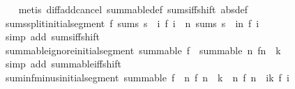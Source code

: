 \begin{isabellebody}
%
\isadelimproof
\ \ %
\endisadelimproof
%
\isatagproof
{}\isamarkupfalse%
\ {\isacharparenleft}{\kern0pt}metis\ diff{\isacharunderscore}{\kern0pt}add{\isacharunderscore}{\kern0pt}cancel\ summable{\isacharunderscore}{\kern0pt}def\ sums{\isacharunderscore}{\kern0pt}iff{\isacharunderscore}{\kern0pt}shift\ {\isacharbrackleft}{\kern0pt}abs{\isacharunderscore}{\kern0pt}def{\isacharbrackright}{\kern0pt}{\isacharparenright}{\kern0pt}%
\endisatagproof
{\isafoldproof}%
%
\isadelimproof
\isanewline
%
\endisadelimproof
\isanewline
{}\isamarkupfalse%
\ sums{\isacharunderscore}{\kern0pt}split{\isacharunderscore}{\kern0pt}initial{\isacharunderscore}{\kern0pt}segment{\isacharcolon}{\kern0pt}\ {\isachardoublequoteopen}f\ sums\ s\ {\isasymLongrightarrow}\ {\isacharparenleft}{\kern0pt}{\isasymlambda}i{\isachardot}{\kern0pt}\ f\ {\isacharparenleft}{\kern0pt}i\ {\isacharplus}{\kern0pt}\ n{\isacharparenright}{\kern0pt}{\isacharparenright}{\kern0pt}\ sums\ {\isacharparenleft}{\kern0pt}s\ {\isacharminus}{\kern0pt}\ {\isacharparenleft}{\kern0pt}{\isasymSum}i{\isacharless}{\kern0pt}n{\isachardot}{\kern0pt}\ f\ i{\isacharparenright}{\kern0pt}{\isacharparenright}{\kern0pt}{\isachardoublequoteclose}\isanewline
%
\isadelimproof
\ \ %
\endisadelimproof
%
\isatagproof
{}\isamarkupfalse%
\ {\isacharparenleft}{\kern0pt}simp\ add{\isacharcolon}{\kern0pt}\ sums{\isacharunderscore}{\kern0pt}iff{\isacharunderscore}{\kern0pt}shift{\isacharparenright}{\kern0pt}%
\endisatagproof
{\isafoldproof}%
%
\isadelimproof
\isanewline
%
\endisadelimproof
\isanewline
{}\isamarkupfalse%
\ summable{\isacharunderscore}{\kern0pt}ignore{\isacharunderscore}{\kern0pt}initial{\isacharunderscore}{\kern0pt}segment{\isacharcolon}{\kern0pt}\ {\isachardoublequoteopen}summable\ f\ {\isasymLongrightarrow}\ summable\ {\isacharparenleft}{\kern0pt}{\isasymlambda}n{\isachardot}{\kern0pt}\ f{\isacharparenleft}{\kern0pt}n\ {\isacharplus}{\kern0pt}\ k{\isacharparenright}{\kern0pt}{\isacharparenright}{\kern0pt}{\isachardoublequoteclose}\isanewline
%
\isadelimproof
\ \ %
\endisadelimproof
%
\isatagproof
{}\isamarkupfalse%
\ {\isacharparenleft}{\kern0pt}simp\ add{\isacharcolon}{\kern0pt}\ summable{\isacharunderscore}{\kern0pt}iff{\isacharunderscore}{\kern0pt}shift{\isacharparenright}{\kern0pt}%
\endisatagproof
{\isafoldproof}%
%
\isadelimproof
\isanewline
%
\endisadelimproof
\isanewline
{}\isamarkupfalse%
\ suminf{\isacharunderscore}{\kern0pt}minus{\isacharunderscore}{\kern0pt}initial{\isacharunderscore}{\kern0pt}segment{\isacharcolon}{\kern0pt}\ {\isachardoublequoteopen}summable\ f\ {\isasymLongrightarrow}\ {\isacharparenleft}{\kern0pt}{\isasymSum}n{\isachardot}{\kern0pt}\ f\ {\isacharparenleft}{\kern0pt}n\ {\isacharplus}{\kern0pt}\ k{\isacharparenright}{\kern0pt}{\isacharparenright}{\kern0pt}\ {\isacharequal}{\kern0pt}\ {\isacharparenleft}{\kern0pt}{\isasymSum}n{\isachardot}{\kern0pt}\ f\ n{\isacharparenright}{\kern0pt}\ {\isacharminus}{\kern0pt}\ {\isacharparenleft}{\kern0pt}{\isasymSum}i{\isacharless}{\kern0pt}k{\isachardot}{\kern0pt}\ f\ i{\isacharparenright}{\kern0pt}{\isachardoublequoteclose}\isanewline

\end{isabellebody}
